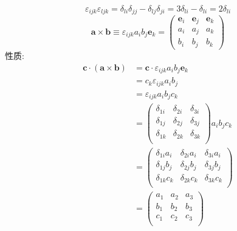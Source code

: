 \begin{equation}
    \varepsilon_{ijk}\varepsilon_{ljk}  =\delta_{li}\delta_{jj}-\delta_{lj}\delta_{ji} =3\delta_{li}-\delta_{li} =2\delta_{li}
\end{equation}
\begin{equation}
    \boldsymbol{a}\times\boldsymbol{b}\equiv \varepsilon_{ijk} a_i b_j \boldsymbol{e}_k=\begin{pmatrix}
        \boldsymbol{e}_i & \boldsymbol{e}_j & \boldsymbol{e}_k \\
        a_i              & a_j              & a_k              \\
        b_i              & b_j              & b_k
    \end{pmatrix}
\end{equation}
性质:
\begin{align}
    \boldsymbol{c}\cdot(\boldsymbol{a}\times\boldsymbol{b})
     & =\boldsymbol{c}\cdot\varepsilon_{ijk} a_i b_j \boldsymbol{e}_k\nonumber \\
     & =c_k\varepsilon_{ijk} a_i b_j \nonumber                                 \\
     & =\varepsilon_{ijk} a_i b_j c_k\nonumber                                 \\
     & =\begin{pmatrix}
                  \delta_{1i} & \delta_{2i} & \delta_{3i} \\
                  \delta_{1j} & \delta_{2j} & \delta_{3j} \\
                  \delta_{1k} & \delta_{2k} & \delta_{3k} \\
              \end{pmatrix}a_i b_j c_k\nonumber                          \\
     & =\begin{pmatrix}
                  \delta_{1i}a_i  & \delta_{2i}a_i  & \delta_{3i}a_i \\
                  \delta_{1j} b_j & \delta_{2j} b_j & \delta_{3j}b_j \\
                  \delta_{1k}c_k  & \delta_{2k} c_k & \delta_{3k}c_k \\
              \end{pmatrix}\nonumber               \\
     & =\begin{pmatrix}
                  a_1 & a_2 & a_3 \\
                  b_1 & b_2 & b_3 \\
                  c_1 & c_2 & c_3 \\
              \end{pmatrix}\label{标量三重积}
\end{align}
